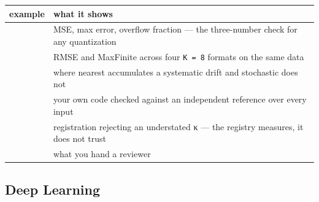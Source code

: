 \begin{table}[h]
\centering
\begin{tabulary}{\linewidth}{L L}
\toprule
example & what it shows \\
\toprule
{} & MSE, max error, overflow fraction — the three-number check for any quantization \\
 & RMSE and MaxFinite across four \texttt{K = 8} formats on the same data \\
 & where nearest accumulates a systematic drift and stochastic does not \\
 & your own code checked against an independent reference over every input \\
 & registration rejecting an understated κ — the registry measures, it does not trust \\
 & what you hand a reviewer \\
\bottomrule
\end{tabulary}

\end{table}



\subsection{Deep Learning}



\label{15209394077164581735}{}



